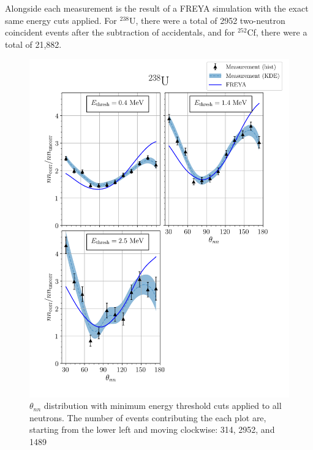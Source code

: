 Alongside each measurement is the result of a FREYA simulation with the exact same energy cuts applied.
For $^{238}$U, there were a total of 2952 two-neutron coincident events after the subtraction of accidentals, and for $^{252}$Cf, there were a total of 21,882.

\FloatBarrier
\begin{figure}
\centering
    \includegraphics[width = 1.1\textwidth]{Content/Results/FinalDUResultw_freya0KDE.png}
    \caption{$\theta_{nn}$ distribution with minimum energy threshold cuts applied to all neutrons.
    The number of events contributing the each plot are, starting from the lower left and moving clockwise: 314, 2952, and 1489 }
    \label{fig:DU(0)}
\end{figure}

